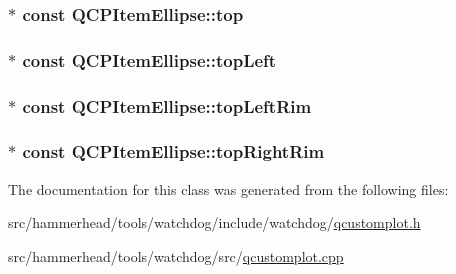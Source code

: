 \subsubsection[{\texorpdfstring{top}{top}}]{$\ast$ const Q\+C\+P\+Item\+Ellipse\+::top}\hypertarget{classQCPItemEllipse_ad50f907d6f9d1402c6c5d302dca5c5d5}{}\label{classQCPItemEllipse_ad50f907d6f9d1402c6c5d302dca5c5d5}
\subsubsection[{\texorpdfstring{top\+Left}{topLeft}}]{$\ast$ const Q\+C\+P\+Item\+Ellipse\+::top\+Left}\hypertarget{classQCPItemEllipse_a12fd8420c06718d0c8a2303d6a652848}{}\label{classQCPItemEllipse_a12fd8420c06718d0c8a2303d6a652848}
\subsubsection[{\texorpdfstring{top\+Left\+Rim}{topLeftRim}}]{$\ast$ const Q\+C\+P\+Item\+Ellipse\+::top\+Left\+Rim}\hypertarget{classQCPItemEllipse_a33ebd2a751b63b9240edc9aa46c19eff}{}\label{classQCPItemEllipse_a33ebd2a751b63b9240edc9aa46c19eff}
\subsubsection[{\texorpdfstring{top\+Right\+Rim}{topRightRim}}]{$\ast$ const Q\+C\+P\+Item\+Ellipse\+::top\+Right\+Rim}\hypertarget{classQCPItemEllipse_a744446970b38a4a3bbea46d722b7c54d}{}\label{classQCPItemEllipse_a744446970b38a4a3bbea46d722b7c54d}


The documentation for this class was generated from the following files\+:\begin{DoxyCompactItemize}
\item 
src/hammerhead/tools/watchdog/include/watchdog/\hyperlink{qcustomplot_8h}{qcustomplot.\+h}\item 
src/hammerhead/tools/watchdog/src/\hyperlink{qcustomplot_8cpp}{qcustomplot.\+cpp}\end{DoxyCompactItemize}
